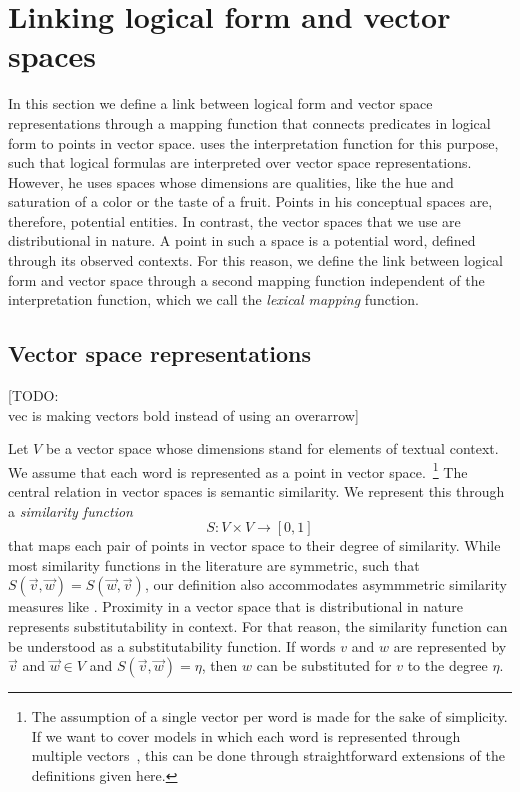 \newcommand{\loglang}{\ensuremath{{\cal{L}}}\xspace}
\newcommand{\predsym}[1]{\ensuremath{{\cal{P}}_{#1}}\xspace}


\section{Linking logical form and vector spaces}
\label{sec:interface}

In this section we define a link between logical form and vector space
representations through a mapping function that connects predicates in
logical form to points in vector space. \citet{Gardenfors:04} uses the
interpretation function for this purpose, such that 
logical formulas are interpreted over vector space
representations. However, he uses spaces whose dimensions are
qualities, like the hue and saturation of a color or the taste of a
fruit. Points in his conceptual spaces are, therefore, potential
entities. In contrast, the vector spaces that we use are
distributional in nature. A point in such a space is a potential word,
defined through its observed contexts. For this reason, we define the link between logical form
and vector space through a second mapping function independent of the
interpretation function, which we call the \emph{lexical mapping}
function. 

\subsection*{Vector space representations} 

[TODO: \\vec is making vectors bold instead of using an overarrow]

Let $V$ be a vector space whose dimensions stand for elements of  textual
context. We assume that each word is represented as a point in vector
space.~\footnote{The assumption of a single vector per word is made
  for the sake of simplicity. If we want to cover models in which each word is
  represented through multiple
  vectors~\citep{ReisingerMooney:10,dinu-lapata:2010:EMNLP}, this can
  be done through straightforward extensions of the definitions given here.} The central relation in vector spaces is semantic
similarity. We represent this through a \textit{similarity function} \[S: V
\times V \to [0,1] \] that maps each pair of points in vector space to their
degree of similarity. While most similarity functions in the
literature are symmetric, such that  $S(\vec v, \vec w) = S(\vec w,
\vec v)$, our definition also accommodates asymmmetric similarity
measures like \citet{kotlerman:nlej2010}. Proximity in a
vector space that is distributional in nature represents
substitutability in context. For that reason, the similarity function can be understood as a
substitutability function.  If words $v$ and $w$ are represented by $\vec
v$ and $\vec w \in V$ and $S(\vec v, \vec w) = \eta$, then $w$ can be
substituted for $v$ to the degree $\eta$.



